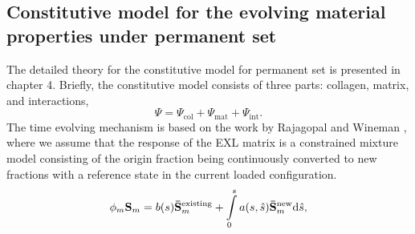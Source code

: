 \subsection{Constitutive model for the evolving material properties under permanent set}

    The detailed theory for the constitutive model for permanent set is presented in chapter 4. Briefly, the constitutive model consists of three parts: collagen, matrix, and interactions,
\begin{equation}
\Psi 	= \Psi_\mathrm{col} + \Psi_\mathrm{mat} + \Psi_\mathrm{int} \label{c6:eqn:structuralmodelcomponents}. 
\end{equation}
    The time evolving mechanism is based on the work by Rajagopal and Wineman \cite{rajagopal_constitutive_1992}, where we assume that the response of the EXL matrix is a constrained mixture model consisting of the origin fraction being continuously converted to new fractions with a reference state in the current loaded configuration. 
\begin{equation} \label{c6:eq:wineman}
\phi_m \mathbf{S}_m = b(s)\mathbf{\bar{S}}_m^\mathrm{existing} + \int\displaylimits_0^s a(s,\hat{s})\mathbf{\bar{S}}_m^\mathrm{new} \mathrm{d}\hat{s},
\end{equation}

